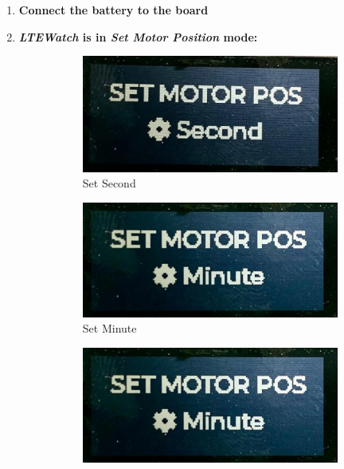\documentclass[Report.tex]{subfiles}
\begin{document}
\begin{enumerate}
\item \textbf{Connect the battery to the board}
\item \textbf{\textit{LTEWatch} is in \textit{Set Motor Position} mode:}
\begin{figure}[H]
	\centering
\begin{subfigure}{.3\textwidth}
\centering
\includegraphics[width=1\textwidth]{Include/Figure/modification/display_1}
\caption{Set Second}
\end{subfigure}	
\begin{subfigure}{.3\textwidth}
\centering
\includegraphics[width=1\textwidth]{Include/Figure/modification/display_2}
\caption{Set Minute}
\end{subfigure}	
\begin{subfigure}{.3\textwidth}
\centering
\includegraphics[width=1\textwidth]{Include/Figure/modification/display_2}

\end{subfigure}
\end{figure}
\end{enumerate}
\end{document}

